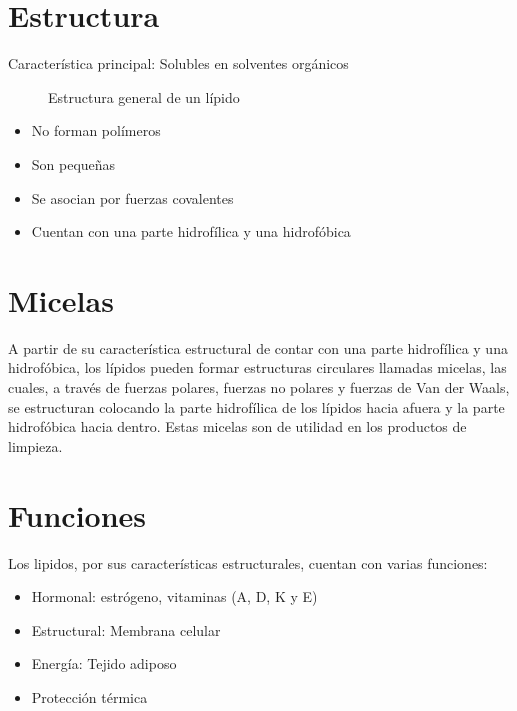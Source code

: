 
\section{Estructura}

Característica principal: Solubles en solventes orgánicos

\begin{figure}[H]
    \centering
    \caption{Estructura general de un lípido}
    \label{fig:estructura_lípidos}
\end{figure}

\begin{itemize}
    \item No forman polímeros
    \item Son pequeñas
    \item Se asocian por fuerzas covalentes
    \item Cuentan con una parte hidrofílica y una hidrofóbica
\end{itemize}

\section{Micelas}

A partir de su característica estructural de contar con una parte hidrofílica y una hidrofóbica, los lípidos pueden formar estructuras circulares llamadas micelas, las cuales, a través de fuerzas polares, fuerzas no polares y fuerzas de Van der Waals, se estructuran colocando la parte hidrofílica de los lípidos hacia afuera y la parte hidrofóbica hacia dentro. Estas micelas son de utilidad en los productos de limpieza.

\section{Funciones}

Los lipidos, por sus características estructurales, cuentan con varias funciones:

\begin{itemize}
    \item Hormonal: estrógeno, vitaminas (A, D, K y E)
    \item Estructural: Membrana celular
    \item Energía: Tejido adiposo
    \item Protección térmica
\end{itemize}